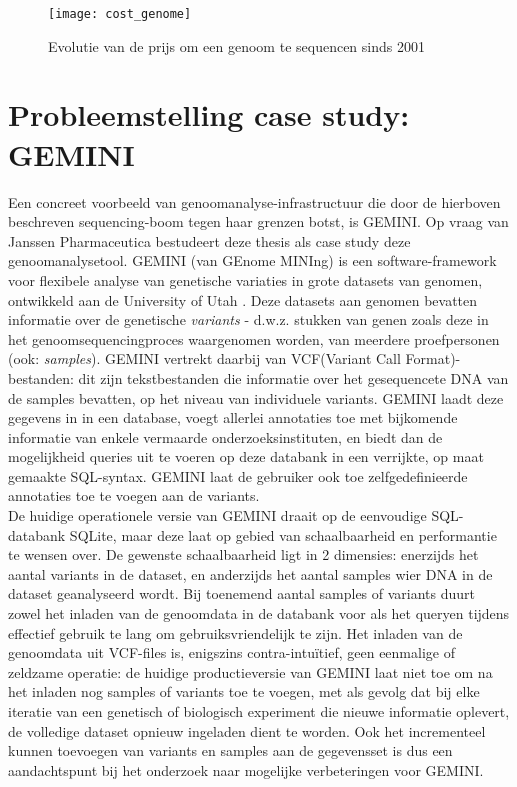 \begin{figure}[h!]
\texttt{[image: cost\_genome]}
\caption{Evolutie van de prijs om een genoom te sequencen sinds 2001 \cite{wetterstrand_sequencing_cost}}
\label{sequencing_cost}
\end{figure}

\section{Probleemstelling case study: GEMINI}

Een concreet voorbeeld van genoomanalyse-infrastructuur die door de hierboven beschreven sequencing-boom tegen haar grenzen botst, is GEMINI. Op vraag van Janssen Pharmaceutica bestudeert deze thesis als case study deze genoomanalysetool. GEMINI (van GEnome MINIng) is een software-framework voor flexibele analyse van genetische variaties in grote datasets van genomen, ontwikkeld aan de University of Utah \cite{10.1371/journal.pcbi.1003153}. Deze datasets aan genomen bevatten informatie over de genetische \textit{variants} - d.w.z. stukken van genen zoals deze in het genoomsequencingproces waargenomen worden, van meerdere proefpersonen (ook: \textit{samples}). GEMINI vertrekt daarbij van VCF(Variant Call Format)-bestanden: dit zijn tekstbestanden die informatie over het gesequencete DNA van de samples bevatten, op het niveau van individuele variants. GEMINI laadt deze gegevens in in een database, voegt allerlei annotaties toe met bijkomende informatie van enkele vermaarde onderzoeksinstituten, en biedt dan de mogelijkheid queries uit te voeren op deze databank in een verrijkte, op maat gemaakte SQL-syntax. GEMINI laat de gebruiker ook toe zelfgedefinieerde annotaties toe te voegen aan de variants. \\
De huidige operationele versie van GEMINI draait op de eenvoudige SQL-databank SQLite, maar deze laat op gebied van schaalbaarheid en performantie te wensen over. De gewenste schaalbaarheid ligt in 2 dimensies: enerzijds het aantal variants in de dataset, en anderzijds het aantal samples wier DNA in de dataset geanalyseerd wordt. Bij toenemend 
aantal samples of variants duurt zowel het inladen van de genoomdata in de databank voor als het queryen tijdens effectief gebruik te lang om gebruiksvriendelijk te zijn. Het inladen van de genoomdata uit VCF-files is, enigszins contra-intu\"itief, geen eenmalige of zeldzame operatie: de huidige productieversie van GEMINI laat niet toe om na het inladen nog samples of variants toe te voegen, met als gevolg dat bij elke iteratie van een genetisch of biologisch experiment die nieuwe informatie oplevert, de volledige dataset opnieuw ingeladen dient te worden. Ook het incrementeel kunnen toevoegen van variants en samples aan de gegevensset is dus een aandachtspunt bij het onderzoek naar mogelijke verbeteringen voor GEMINI.\\
